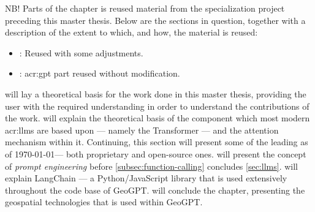 \begin{itshape}
    NB! Parts of the  chapter is reused material from the specialization project \citep{holmLLMsDeathGIS2023} preceding this master thesis. Below are the sections in question, together with a description of the extent to which, and how, the material is reused:

    \begin{itemize}
        \item {}: Reused with some adjustments.
        \item {}: \acrshort{acr:gpt} part reused without modification.
    \end{itemize}
\end{itshape}

\vspace{12pt}

\noindent {} will lay a theoretical basis for the work done in this master thesis, providing the user with the required understanding in order to understand the contributions of the work.  will explain the theoretical basis of the component which most modern \glspl{acr:llm} are based upon --- namely the Transformer --- and the attention mechanism within it. Continuing, this section will present some of the leading  as of \today --- both proprietary and open-source ones.  will present the concept of \textit{prompt engineering} before \autoref{subsec:function-calling} concludes \autoref{sec:llms}.  will explain LangChain --- a Python/JavaScript library that is used extensively throughout the code base of GeoGPT.  will conclude the  chapter, presenting the geospatial technologies that is used within GeoGPT.




